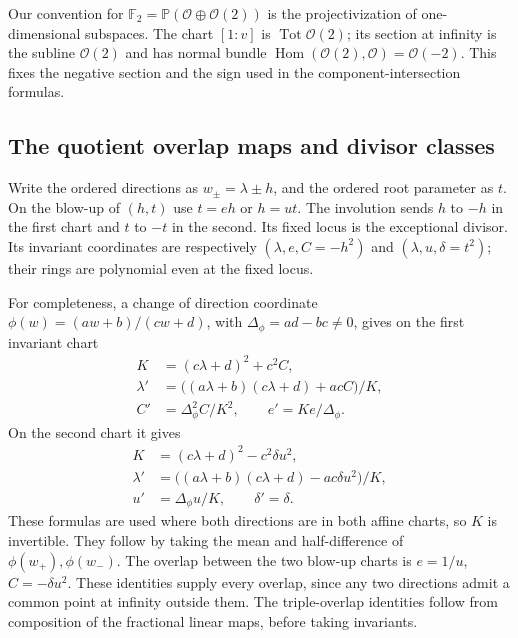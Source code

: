\documentclass[11pt,reqno]{amsart}
\numberwithin{equation}{section}
\theoremstyle{definition}\newtheorem{definition}[theorem]{Definition}
\theoremstyle{remark}\newtheorem{remark}[theorem]{Remark}
\newcommand{\Pj}{\mathbb P}\newcommand{\A}{\mathbb A}
\newcommand{\OO}{\mathcal O}\newcommand{\II}{\mathcal I}
\begin{document}
Our convention for $\mathbb F_2=\Pj(\OO\oplus\OO(2))$ is the
projectivization of one-dimensional subspaces. The chart $[1:v]$
is $\operatorname{Tot}\OO(2)$; its section at infinity is the
subline $\OO(2)$ and has normal bundle
$\operatorname{Hom}(\OO(2),\OO)=\OO(-2)$. This fixes the negative
section and the sign used in the component-intersection formulas.

\subsection{The quotient overlap maps and divisor classes}
Write the ordered directions as $w_\pm=\lambda\pm h$, and the
ordered root parameter as $t$. On the blow-up of $(h,t)$ use
$t=eh$ or $h=ut$. The involution sends $h$ to $-h$ in the first
chart and $t$ to $-t$ in the second. Its fixed locus is the
exceptional divisor. Its invariant coordinates are respectively
$(\lambda,e,C=-h^2)$ and $(\lambda,u,\delta=t^2)$; their rings
are polynomial even at the fixed locus.

For completeness, a change of direction coordinate
$\phi(w)=(aw+b)/(cw+d)$, with $\Delta_\phi=ad-bc\ne0$, gives
on the first invariant chart
\begin{equation}\label{eq:quotient-overlap-first-v166}
\begin{split}
 K&=(c\lambda+d)^2+c^2C,\\
 \lambda'&=\bigl((a\lambda+b)(c\lambda+d)+acC\bigr)/K,\\
 C'&=\Delta_\phi^2C/K^2,\qquad e'=Ke/\Delta_\phi.
\end{split}
\end{equation}
On the second chart it gives
\begin{equation}\label{eq:quotient-overlap-second-v166}
\begin{split}
 K&=(c\lambda+d)^2-c^2\delta u^2,\\
 \lambda'&=\bigl((a\lambda+b)(c\lambda+d)-ac\delta u^2\bigr)/K,\\
 u'&=\Delta_\phi u/K,\qquad\delta'=\delta.
\end{split}
\end{equation}
These formulas are used where both directions are in both affine
charts, so $K$ is invertible. They follow by taking the mean and
half-difference of $\phi(w_+),\phi(w_-)$. The overlap between the
two blow-up charts is $e=1/u$, $C=-\delta u^2$. These identities
supply every overlap, since any two directions admit a common
point at infinity outside them. The triple-overlap identities
follow from composition of the fractional linear maps, before
taking invariants.
\end{document}
